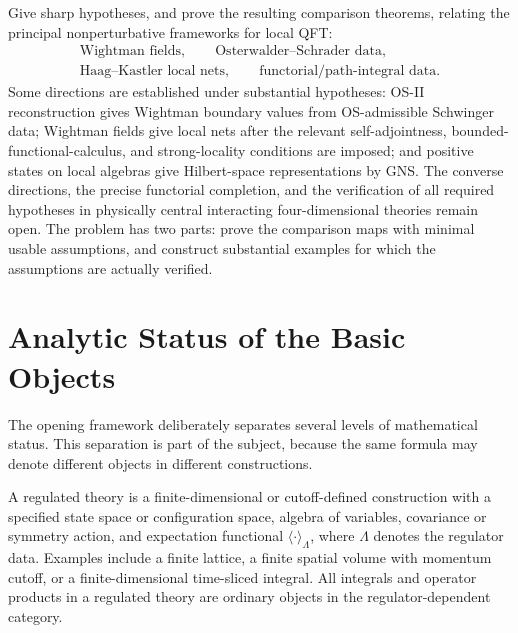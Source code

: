 \begin{openproblem}
\label{op:axiomatic-comparison-physical-examples}
Give sharp hypotheses, and prove the resulting comparison theorems, relating
the principal nonperturbative frameworks for local QFT:
\[
\begin{gathered}
  \text{Wightman fields},\qquad
  \text{Osterwalder--Schrader data},\\
  \text{Haag--Kastler local nets},\qquad
  \text{functorial/path-integral data}.
\end{gathered}
\]
Some directions are established under substantial hypotheses: OS-II
reconstruction gives Wightman boundary values from OS-admissible Schwinger
data; Wightman fields give local nets after the relevant self-adjointness,
bounded-functional-calculus, and strong-locality conditions are imposed; and
positive states on local algebras give Hilbert-space representations by GNS.
The converse directions, the precise functorial completion, and the
verification of all required hypotheses in physically central interacting
four-dimensional theories remain open.  The problem has two parts: prove the
comparison maps with minimal usable assumptions, and construct substantial
examples for which the assumptions are actually verified.
\end{openproblem}

\section{Analytic Status of the Basic Objects}

The opening framework deliberately separates several levels of mathematical
status.  This separation is part of the subject, because the same formula may
denote different objects in different constructions.

\begin{definition}
\label{def:regulated-theory-opening}
  A regulated theory is a finite-dimensional or cutoff-defined construction
  with a specified state space or configuration space, algebra of variables,
  covariance or symmetry action, and expectation functional
  \(\langle\cdot\rangle_\Lambda\), where \(\Lambda\) denotes the regulator
  data.  Examples include a finite lattice, a finite spatial volume with
  momentum cutoff, or a finite-dimensional time-sliced integral.  All
  integrals and operator products in a regulated theory are ordinary objects
  in the regulator-dependent category.
\end{definition}

